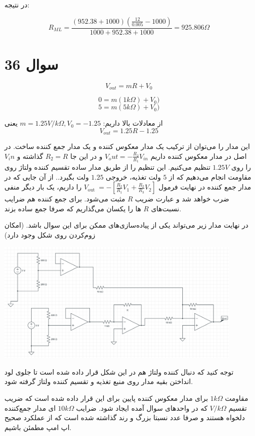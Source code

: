 \documentclass[12pt]{article}
\begin{document}
در نتیجه:

$$R_{ML} = \frac{(952.38+1000)(\frac{12}{0.005} - 1000)}{1000+952.38+1000} = 925.806 \Omega$$

\newpage

\section*{سوال 36}

$$V_{out} = m R + V_0$$

$$0 = m(1 k \Omega) + V_0)$$
$$5 = m(5 k \Omega) + V_0)$$

از معادلات بالا داریم:
$m = 1.25 V/k\Omega , V_0 = -1.25$
یعنی
$$V_{out} = 1.25 R - 1.25$$

این مدار را می‌توان از ترکیب یک مدار معکوس کننده و یک مدار جمع کننده ساخت. در اصل در مدار معکوس کننده داریم
$V_out = -\frac{R_2}{R_1} V_{in}$
و در این جا $R_2 =R$ گذاشته و $V_in$ را روی $1.25 V$ تنظیم می‌کنیم. این تنظیم را از طریق مدار ساده تقسیم کننده ولتاژ روی مقاومت انجام می‌دهیم که از $5$ ولت تغذیه، خروجی $1.25$ ولت بگیرد.. از آن جایی که در مدار جمع کننده در نهایت فرمول $V_{\text {out }}=-\left[\frac{R_{2}}{R_{1}} V_{1}+\frac{R_{2}}{R_{3}} V_{2}\right]$ را داریم، یک بار دیگر منفی ضرب خواهد شد و عبارت ضریب $R$ مثبت می‌شود. برای جمع کننده هم ضرایب نسبت‌های $R$ ها را یکسان می‌گذاریم که صرفا جمع ساده بزند.

در نهایت مدار زیر می‌تواند یکی از پیاده‌سازی‌های ممکن برای این سوال باشد. (امکان زوم‌کردن روی شکل وجود دارد)


\begin{center}
	\includegraphics[width = 0.9\textwidth]{images/7.png}
\end{center}

توجه کنید که دنبال کننده ولتاژ هم در این شکل قرار داده شده است تا جلوی لود انداختن بقیه مدار روی منبع تغذیه و تقسیم کننده ولتاژ گرفته شود.

مقاومت $1k\Omega$ برای مدار معکوس کننده پایین برای این قرار داده شده است که ضریب تقسیم $V/k\Omega$ که در واحد‌های سوال آمده ایجاد شود. ضرایب $10k\Omega$ ای مدار جمع‌کننده دلخواه هستند و صرفا عدد نسبتا بزرگ و رند گذاشته شده است که از عملکرد صحیح اپ امپ مطمئن باشیم.
\end{document}
